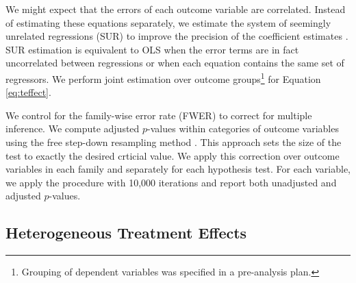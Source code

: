 \documentclass[12pt]{article}
\begin{document}
		We might expect that the errors of each outcome variable are correlated. Instead of estimating these equations separately, we estimate the system of seemingly unrelated regressions (SUR) to improve the precision of the coefficient estimates \parencite{zellner_efficient_1962}. SUR estimation is equivalent to OLS when the error terms are in fact uncorrelated between regressions or when each equation contains the same set of regressors. We perform joint estimation over outcome groups\footnote{Grouping of dependent variables was specified in a pre-analysis plan.} for Equation \ref{eq:teffect}.

		We control for the family-wise error rate (FWER) to correct for multiple inference. We compute adjusted $p$-values within categories of outcome variables using the free step-down resampling method \parencite{westfall_resampling-based_1993,anderson_multiple_2008}. This approach sets the size of the test to exactly the desired crticial value. We apply this correction over outcome variables in each family and separately for each hypothesis test. For each variable, we apply the procedure with 10,000 iterations and report both unadjusted and adjusted $p$-values.





	\subsection{Heterogeneous Treatment Effects}
\end{document}
